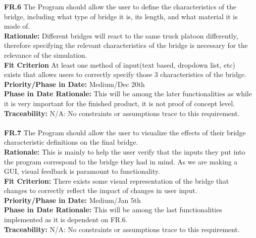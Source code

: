 \documentclass[12pt]{article}
\begin{document}
  \noindent\textbf{FR.6} The Program should allow the user to define the characteristics of the bridge, including what type of bridge it is, its length, and what material it
  is made of.\\
  \textbf{Rationale:} Different bridges will react to the same truck platoon differently, therefore specifying the relevant characteristics of the bridge is necessary for
  the relevance of the simulation.\\
  \textbf{Fit Criterion} At least one method of input(text based, dropdown list, etc) exists that allows users to correctly specify those 3 characteristics of the bridge.\\
  \textbf{Priority/Phase in Date:} Medium/Dec 20th\\
  \textbf{Phase in Date Rationale:} This will be among the later functionalities as while it is very important for the finished product, it is not proof of concept level.\\
  \textbf{Traceability:} N/A: No constraints or assumptions trace to this requirement.\\\\
  
  \noindent\textbf{FR.7} The Program should allow the user to visualize the effects of their bridge characteristic definitions on the final bridge.\\
  \textbf{Rationale:} This is mainly to help the user verify that the inputs they put into the program correspond to the bridge they had in mind. As we are making a GUI,
  visual feedback is paramount to functionality.\\
  \textbf{Fit Criterion:} There exists some visual representation of the bridge that changes to correctly reflect the impact of changes in user input.\\
  \textbf{Priority/Phase in Date:} Medium/Jan 5th\\
  \textbf{Phase in Date Rationale:} This will be among the last functionalities implemented as it is dependent on FR.6.\\
  \textbf{Traceability:} N/A: No constraints or assumptions trace to this requirement.\\\\
  
\end{document}
